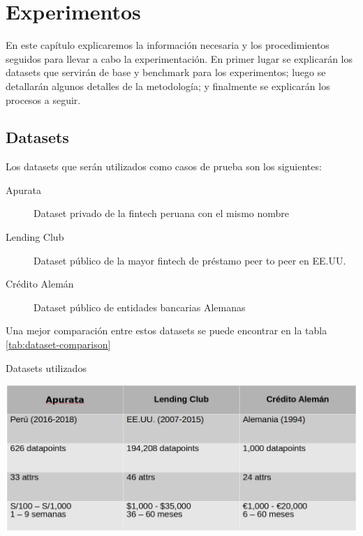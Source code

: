 \chapter{Experimentos}


En este capítulo explicaremos la información necesaria y los procedimientos seguidos para llevar a cabo la experimentación. En primer lugar se explicarán los datasets que servirán de base y benchmark para los experimentos; luego se detallarán algunos detalles de la metodología; y finalmente se explicarán los procesos a seguir.

\section{Datasets}

Los datasets que serán utilizados como casos de prueba son los siguientes:

\begin{description}
    \item[Apurata] Dataset privado de la fintech peruana con el mismo nombre
    \item[Lending Club] Dataset público de la mayor fintech de préstamo peer to peer en EE.UU.
    \item[Crédito Alemán] Dataset público de entidades bancarias Alemanas
\end{description}

Una mejor comparación entre estos datasets se puede encontrar en la tabla \ref{tab:dataset-comparison}

\begin{table}
    \centering
    \caption{Datasets utilizados}
    \label{tab:dataset-comparison}
    \includegraphics[width=0.8\linewidth]{graficos/dataset_comparison.png}
\end{table}

